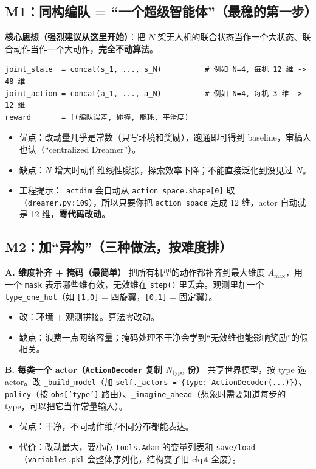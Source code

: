 \documentclass[11pt]{ctexart}
\begin{document}
\subsection{M1：同构编队 = ``一个超级智能体''（最稳的第一步）}
\textbf{核心思想（强烈建议从这里开始）}：把 $N$ 架无人机的联合状态当作一个大状态、联合动作当作一个大动作，\textbf{完全不动算法}。
\begin{Verbatim}[frame=single,fontsize=\small]
joint_state  = concat(s_1, ..., s_N)          # 例如 N=4, 每机 12 维 -> 48 维
joint_action = concat(a_1, ..., a_N)          # 例如 N=4, 每机 3 维 -> 12 维
reward       = f(编队误差, 碰撞, 能耗, 平滑度)
\end{Verbatim}
\begin{itemize}
  \item 优点：改动量几乎是常数（只写环境和奖励），跑通即可得到 baseline，审稿人也认（``centralized Dreamer''）。
  \item 缺点：$N$ 增大时动作维线性膨胀，探索效率下降；不能直接泛化到没见过 $N$。
  \item 工程提示：\texttt{\_actdim} 会自动从 \texttt{action\_space.shape[0]} 取（\texttt{dreamer.py:109}），所以只要你把 \texttt{action\_space} 定成 12 维，actor 自动就是 12 维，\textbf{零代码改动}。
\end{itemize}

\subsection{M2：加``异构''（三种做法，按难度排）}
\textbf{A. 维度补齐 + 掩码（最简单）}
把所有机型的动作都补齐到最大维度 $A_{\max}$，用一个 \texttt{mask} 表示哪些维有效，无效维在 \texttt{step()} 里丢弃。观测里加一个 \texttt{type\_one\_hot}（如 \texttt{[1,0]} = 四旋翼，\texttt{[0,1]} = 固定翼）。
\begin{itemize}
  \item 改：环境 + 观测拼接。算法零改动。
  \item 缺点：浪费一点网络容量；掩码处理不干净会学到``无效维也能影响奖励''的假相关。
\end{itemize}

\textbf{B. 每类一个 actor（\texttt{ActionDecoder} 复制 $N_{\mathrm{type}}$ 份）}
共享世界模型，按 type 选 actor。改 \texttt{\_build\_model}（加 \texttt{self.\_actors = \{type: ActionDecoder(...)\}}）、\texttt{policy}（按 \texttt{obs['type']} 路由）、\texttt{\_imagine\_ahead}（想象时需要知道每步的 type，可以把它当作常量输入）。
\begin{itemize}
  \item 优点：干净，不同动作维/不同分布都能表达。
  \item 代价：改动最大，要小心 \texttt{tools.Adam} 的变量列表和 \texttt{save/load}（\texttt{variables.pkl} 会整体序列化，结构变了旧 ckpt 全废）。
\end{itemize}
\end{document}
